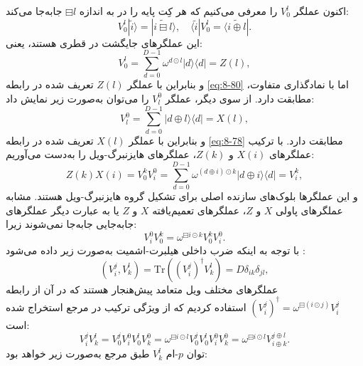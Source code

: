 اکنون عملگر $V_0^l$ را معرفی می‌کنیم که هر کِت پایه را در  به اندازه $\boxminus l$ جابه‌جا می‌کند:
\begin{equation}
	V_0^l |\tilde{i}\rangle = |\widetilde{i \boxminus l}\rangle, \quad \langle \tilde{i} | V_0^l = \langle \widetilde{i \oplus l} |.
	\label{eq:8-86}
\end{equation}
این عملگرهای جایگشت در  قطری هستند، یعنی:
\begin{equation}
	V_0^l = \sum_{d=0}^{D-1} \omega^{d \odot l} |d\rangle \langle d| = Z(l),
	\label{eq:8-87}
\end{equation}
و بنابراین با عملگر $Z(l)$ تعریف شده در رابطه \eqref{eq:8-80} اما با نمادگذاری متفاوت، مطابقت دارد. از سوی دیگر، عملگر $V_l^0$ را می‌توان به‌صورت زیر نمایش داد:
\begin{equation}
	V_l^0 = \sum_{d=0}^{D-1} |d \oplus l\rangle \langle d| = X(l),
	\label{eq:8-88}
\end{equation}
و بنابراین با عملگر $X(l)$ تعریف شده در رابطه \eqref{eq:8-78} مطابقت دارد. با ترکیب عملگرهای $X(i)$ و $Z(k)$، عملگرهای هایزنبرگ-ویل را به‌دست می‌آوریم:
\begin{equation}
	Z(k)X(i) = V_0^k V_i^0 = \sum_{d=0}^{D-1} \omega^{(d \oplus i) \odot k} |d \oplus i\rangle \langle d| = V_i^k,
	\label{eq:8-89}
\end{equation}
و این عملگرها بلوک‌های سازنده اصلی برای تشکیل گروه هایزنبرگ-ویل هستند. مشابه عملگرهای پاولی $X$ و $Z$، عملگرهای تعمیم‌یافته $X$ و $Z$ یا به عبارت دیگر عملگرهای جابه‌جایی جابه‌جا نمی‌شوند زیرا:
\begin{equation}
	V_i^0 V_0^k = \omega^{\boxminus i \odot k} V_0^k V_i^0.
	\label{eq:8-90}
\end{equation}
با توجه به اینکه ضرب داخلی هیلبرت-اشمیت به‌صورت زیر داده می‌شود \cite{8-78}:
\begin{equation}
	(V_i^j, V_k^l) = \text{Tr} \left( (V_i^j)^\dagger V_k^l \right) = D \delta_{ik} \delta_{jl},
	\label{eq:8-91}
\end{equation}
عملگرهای مختلف ویل متعامد پیش‌هنجار هستند که در آن از رابطه $(V_i^j)^\dagger = \omega^{\boxminus(i \odot j)} V_{ i}^{ j}$ استفاده کردیم که از ویژگی ترکیب در مرجع \cite{8-78} استخراج شده است:
\begin{equation}
	V_i^j V_k^l = V_0^j V_i^0 V_0^l V_k^0 = \omega^{\boxminus i \odot l} V_0^j V_0^l V_i^0 V_k^0 = \omega^{\boxminus i \odot l} V_{i \oplus k}^{j \oplus l}.
	\label{eq:8-92}
\end{equation}
توان $p$-ام $V_k^l$ طبق مرجع \cite{8-78} به‌صورت زیر خواهد بود:
